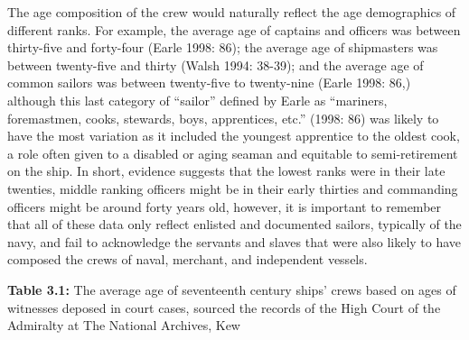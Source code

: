 \begin{styleStandard}
The age composition of the crew would naturally reflect the age demographics of different ranks. For example, the average age of captains and officers was between thirty-five and forty-four (Earle 1998: 86); the average age of shipmasters was between twenty-five and thirty (Walsh 1994: 38-39); and the average age of common sailors was between twenty-five to twenty-nine (Earle 1998: 86,) although this last category of “sailor” defined by Earle as “mariners, foremastmen, cooks, stewards, boys, apprentices, etc.” (1998: 86) was likely to have the most variation as it included the youngest apprentice to the oldest cook, a role often given to a disabled or aging seaman and equitable to semi-retirement on the ship. In short, evidence suggests that the lowest ranks were in their late twenties, middle ranking officers might be in their early thirties and commanding officers might be around forty years old, however, it is important to remember that all of these data only reflect enlisted and documented sailors, typically of the navy, and fail to acknowledge the servants and slaves that were also likely to have composed the crews of naval, merchant, and independent vessels. 
\end{styleStandard}


\begin{styleStandard}
\textbf{Table 3.1:} The average age of seventeenth century ships’ crews based on ages of witnesses deposed in court cases, sourced the records of the High Court of the Admiralty at The National Archives, Kew 
\end{styleStandard}


